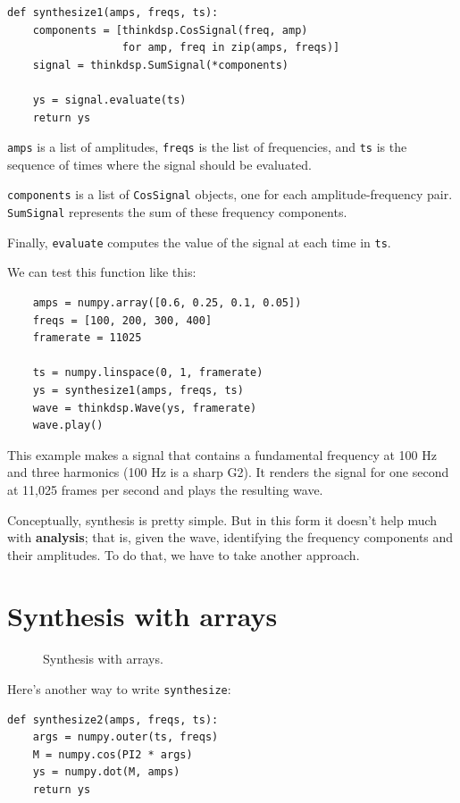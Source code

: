 \documentclass[12pt]{book}
\begin{document}
\begin{verbatim}
def synthesize1(amps, freqs, ts):
    components = [thinkdsp.CosSignal(freq, amp)
                  for amp, freq in zip(amps, freqs)]
    signal = thinkdsp.SumSignal(*components)

    ys = signal.evaluate(ts)
    return ys
\end{verbatim}

{\tt amps} is a list of amplitudes, {\tt freqs} is the list
of frequencies, and {\tt ts} is the sequence
of times where the signal should be evaluated.

{\tt components} is a list of {\tt CosSignal} objects, one for
each amplitude-frequency pair.  {\tt SumSignal} represents the
sum of these frequency components.

Finally, {\tt evaluate} computes the value of the signal at each
time in {\tt ts}.

We can test this function like this:

\begin{verbatim}
    amps = numpy.array([0.6, 0.25, 0.1, 0.05])
    freqs = [100, 200, 300, 400]
    framerate = 11025

    ts = numpy.linspace(0, 1, framerate)
    ys = synthesize1(amps, freqs, ts)
    wave = thinkdsp.Wave(ys, framerate)
    wave.play()
\end{verbatim}

This example makes a signal that contains a fundamental frequency at
100 Hz and three harmonics (100 Hz is a sharp G2).  It renders the
signal for one second at 11,025 frames per second and plays the
resulting wave.

Conceptually, synthesis is pretty simple.  But in this form it doesn't
help much with {\bf analysis}; that is, given the wave, identifying
the frequency components and their amplitudes.  To do that, we have
to take another approach.


\section{Synthesis with arrays}

\begin{figure}

\caption{Synthesis with arrays.}
\label{fig.synthesis}
\end{figure}

Here's another way to write {\tt synthesize}:

\begin{verbatim}
def synthesize2(amps, freqs, ts):
    args = numpy.outer(ts, freqs)
    M = numpy.cos(PI2 * args)
    ys = numpy.dot(M, amps)
    return ys
\end{verbatim}
\end{document}
